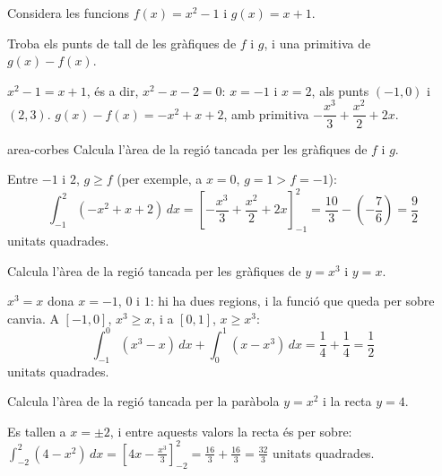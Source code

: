 Considera les funcions $f(x)=x^2-1$ i $g(x)=x+1$.

\begin{apartats}

Troba els punts de tall de les gràfiques de $f$ i $g$, i una primitiva de $g(x)-f(x)$.

\begin{solucio}
$x^2-1=x+1$, és a dir, $x^2-x-2=0$: $x=-1$ i $x=2$, als punts $(-1,0)$ i $(2,3)$.
$g(x)-f(x)=-x^2+x+2$, amb primitiva $-\dfrac{x^3}3+\dfrac{x^2}2+2x$.
\end{solucio}

\begin{tria}{area-corbes}
Calcula l'àrea de la regió tancada per les gràfiques de $f$ i $g$.

\begin{solucio}
Entre $-1$ i $2$, $g\ge f$ (per exemple, a $x=0$, $g=1>f=-1$):
\[
\int_{-1}^2(-x^2+x+2)\,dx=\left[-\frac{x^3}3+\frac{x^2}2+2x\right]_{-1}^2
=\frac{10}3-\left(-\frac76\right)=\frac92
\]
unitats quadrades.
\end{solucio}

Calcula l'àrea de la regió tancada per les gràfiques de $y=x^3$ i $y=x$.

\begin{solucio}
$x^3=x$ dona $x=-1$, $0$ i $1$: hi ha dues regions, i la funció que queda per sobre canvia. A $[-1,0]$,
$x^3\ge x$, i a $[0,1]$, $x\ge x^3$:
\[
\int_{-1}^0(x^3-x)\,dx+\int_0^1(x-x^3)\,dx=\frac14+\frac14=\frac12
\]
unitats quadrades.
\end{solucio}
\end{tria}

\begin{nomesllarg}
Calcula l'àrea de la regió tancada per la paràbola $y=x^2$ i la recta $y=4$.

\begin{solucio}
Es tallen a $x=\pm2$, i entre aquests valors la recta és per sobre:
$\displaystyle\int_{-2}^2(4-x^2)\,dx=\left[4x-\frac{x^3}3\right]_{-2}^2=\frac{16}3+\frac{16}3=\frac{32}3$
unitats quadrades.
\end{solucio}
\end{nomesllarg}

\end{apartats}
